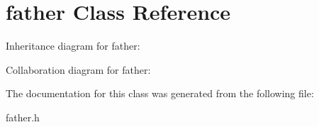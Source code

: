 \hypertarget{classfather}{}\section{father Class Reference}
\label{classfather}


Inheritance diagram for father\+:


Collaboration diagram for father\+:


The documentation for this class was generated from the following file\+:\begin{DoxyCompactItemize}
\item 
father.\+h\end{DoxyCompactItemize}

